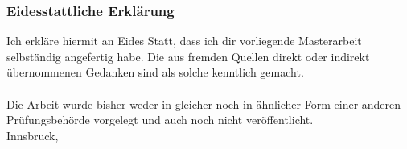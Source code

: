 \documentclass[a4paper,11pt,listof=nochaptergap,oneside,pointednumbers,bibtotoc,bigheadings,liststotoc,hidelinks]{scrbook}
\theoremstyle{mysatz}
\theoremstyle{mydefinition}
\theoremstyle{mytheorem}
\theoremstyle{mybemerkung}
\renewcommand*{\paragraph}[1]{\subsubsection*{#1} \vspace{-3mm}} %
\begin{document}
\clearpage
\thispagestyle{empty}
\null\vspace{46pt}
\paragraph{\large{Eidesstattliche Erklärung}}
\vspace{43pt}
Ich erkläre hiermit an Eides Statt, dass ich dir vorliegende Masterarbeit selbständig angefertig habe. Die aus fremden Quellen direkt oder indirekt übernommenen Gedanken sind als solche kenntlich gemacht. \\
\\
Die Arbeit wurde bisher weder in gleicher noch in ähnlicher Form einer anderen Prüfungsbehörde vorgelegt und auch noch nicht veröffentlicht.\\[10mm]

    Innsbruck, \makebox[1.8in][l]{\hrulefill} \qquad \makebox[2.6in]{\hrulefill}\\
    \makebox[2.95in][l]      \hfill{}


\end{document}
